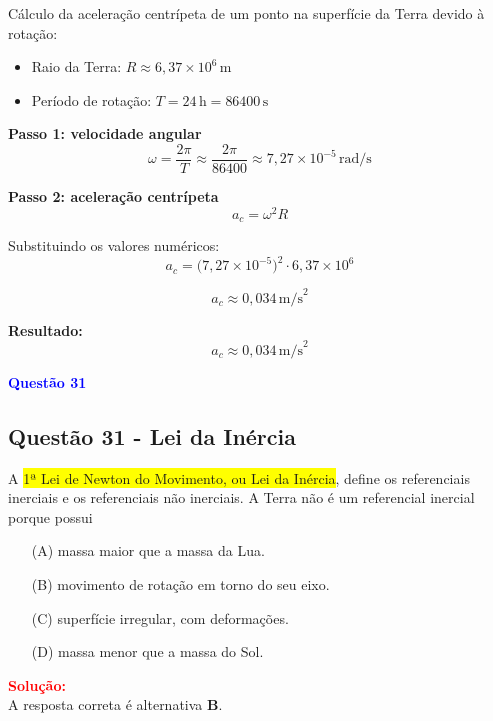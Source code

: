 Cálculo da aceleração centrípeta de um ponto na superfície da Terra devido à rotação:

\begin{itemize}
  \item Raio da Terra: \( R \approx 6,37 \times 10^6 \, \mathrm{m} \)
  \item Período de rotação: \( T = 24 \, \mathrm{h} = 86400 \, \mathrm{s} \)
\end{itemize}

\textbf{Passo 1: velocidade angular}
\[
\omega = \frac{2\pi}{T} \approx \frac{2\pi}{86400} \approx 7,27 \times 10^{-5} \, \mathrm{rad/s}
\]

\textbf{Passo 2: aceleração centrípeta}
\[
a_c = \omega^2 R
\]

Substituindo os valores numéricos:
\[
a_c = \bigl(7,27 \times 10^{-5}\bigr)^2 \cdot 6,37 \times 10^6
\]

\[
a_c \approx 0,034 \, \mathrm{m/s}^2
\]

\textbf{Resultado:}
\[
\boxed{a_c \approx 0,034 \, \mathrm{m/s}^2}
\]

\begin{flushleft}
\textbf{\textcolor{blue}{\Large Quest\~ao 31}}\\
\noindent
\subsection{Quest\~ao 31 - Lei da In\'ercia}
A \colorbox{yellow}{1ª Lei de Newton do Movimento, ou Lei da Inércia}, define 
os referenciais inerciais e os referenciais não inerciais. \colorbox{green!40}{A 
Terra não é um referencial inercial porque possui}

\begin{itemize}
\item[(A)] massa maior que a massa da Lua.
\item[(B)] movimento de rotação em torno do seu eixo.
\item[(C)] superfície irregular, com deformações.
\item[(D)] massa menor que a massa do Sol.
\end{itemize}

\vspace{0.5cm}

\textcolor{red}{\textbf{Solução:}}\\

A resposta correta é alternativa \colorbox{green!50}{\textbf{B}}.
\end{flushleft}

